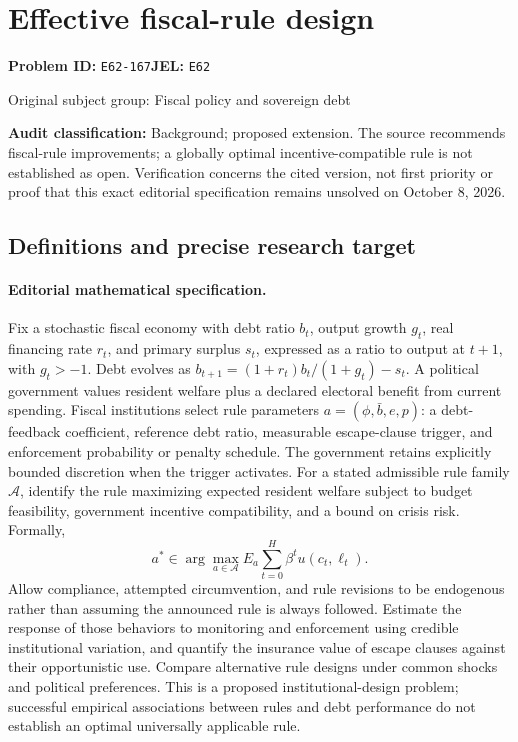 \documentclass[11pt,a4paper]{article}
\begin{document}
\section*{Effective fiscal-rule design}
\textbf{Problem ID:} \texttt{E62-167}\quad \textbf{JEL:} \texttt{E62}\par
\label{problem:OP-0259}
{\sffamily\small\color{muted}Original subject group: Fiscal policy and sovereign debt\par}
\label{definitions:problem:30007540}
\textbf{Audit classification:} Background; proposed extension. The source recommends fiscal-rule improvements; a globally optimal incentive-compatible rule is not established as open. Verification concerns the cited version, not first priority or proof that this exact editorial specification remains unsolved on October 8, 2026.
\subsection*{Definitions and precise research target}
\paragraph{Editorial mathematical specification.} Fix a stochastic fiscal economy with debt ratio \(b_t\), output growth \(g_t\), real financing rate \(r_t\), and primary surplus \(s_t\), expressed as a ratio to output at \(t+1\), with \(g_t>-1\). Debt evolves as \(b_{t+1}=(1+r_t)b_t/(1+g_t)-s_t\). A political government values resident welfare plus a declared electoral benefit from current spending. Fiscal institutions select rule parameters \(a=(\phi,\bar b,e,p)\): a debt-feedback coefficient, reference debt ratio, measurable escape-clause trigger, and enforcement probability or penalty schedule. The government retains explicitly bounded discretion when the trigger activates.
For a stated admissible rule family \(\mathcal A\), identify the rule maximizing expected resident welfare subject to budget feasibility, government incentive compatibility, and a bound on crisis risk. Formally,
\[
a^*\in\arg\max_{a\in\mathcal A}E_a\sum_{t=0}^{H}\beta^t u(c_t,\ell_t).
\]
Allow compliance, attempted circumvention, and rule revisions to be endogenous rather than assuming the announced rule is always followed. Estimate the response of those behaviors to monitoring and enforcement using credible institutional variation, and quantify the insurance value of escape clauses against their opportunistic use. Compare alternative rule designs under common shocks and political preferences. This is a proposed institutional-design problem; successful empirical associations between rules and debt performance do not establish an optimal universally applicable rule.
\end{document}
